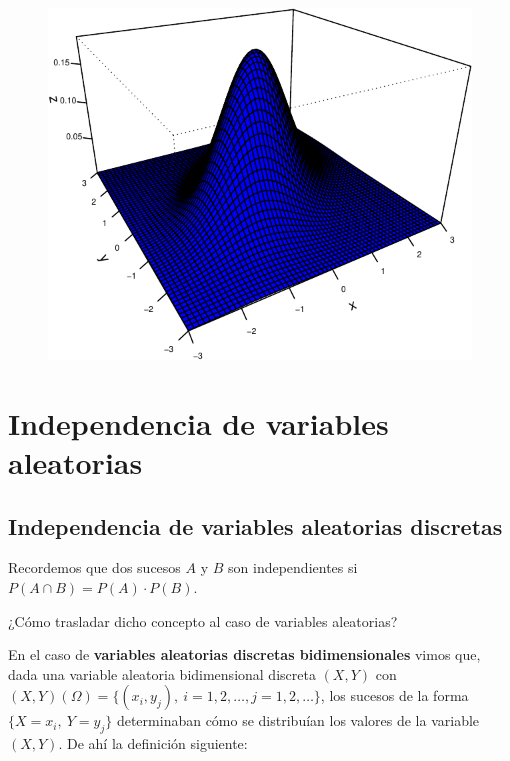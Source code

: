 \documentclass[
  letterpaper,
  DIV=11,
  numbers=noendperiod]{scrreprt}
\begin{document}
\begin{figure}[H]

{\centering \includegraphics{5_files/figure-pdf/unnamed-chunk-15-1.pdf}

}

\end{figure}

\hypertarget{independencia-de-variables-aleatorias}{%
\section{Independencia de variables
aleatorias}\label{independencia-de-variables-aleatorias}}

\hypertarget{independencia-de-variables-aleatorias-discretas}{%
\subsection{Independencia de variables aleatorias
discretas}\label{independencia-de-variables-aleatorias-discretas}}

Recordemos que dos sucesos \(A\) y \(B\) son independientes si
\(P(A\cap B)=P(A)\cdot P(B)\).

¿Cómo trasladar dicho concepto al caso de variables aleatorias?

En el caso de \textbf{variables aleatorias discretas bidimensionales}
vimos que, dada una variable aleatoria bidimensional discreta \((X,Y)\)
con \((X,Y)(\Omega)=\{(x_i,y_j),\ i=1,2,\ldots,j=1,2,\ldots\}\), los
sucesos de la forma \(\{X=x_i,\  Y=y_j\}\) determinaban cómo se
distribuían los valores de la variable \((X,Y)\). De ahí la definición
siguiente:
\end{document}
